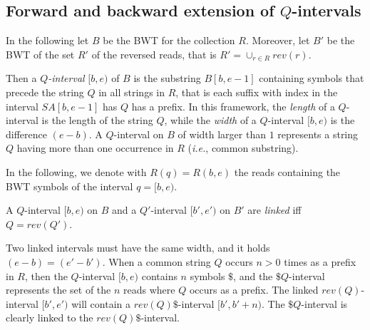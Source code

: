 \documentclass[runningheads,envcountsame,a4paper]{llncs}
\newcommand{\ie}{\textit{i.e.},\xspace}
\begin{document}



\subsection{Forward and backward extension of $Q$-intervals}

In the following let $B$ be the BWT for the collection $R$.
Moreover, let $B'$ be the BWT of the set $R'$ of the reversed reads,
that is $R' = \cup_{r \in R}rev(r)$.


Then a \emph{$Q$-interval} $[b,e)$ of $B$ is the substring $B[b, e -1]$
containing symbols that precede the string $Q$ in all strings in $R$,
that is each suffix with index in the interval $SA[b, e-1]$ has $Q$ has
a prefix.
In this framework, the \emph{length} of a $Q$-interval is the length of
the string $Q$, while the \emph{width} of a $Q$-interval $[b, e)$ is the
difference $(e-b)$.
A $Q$-interval on $B$ of width larger than $1$ represents a string $Q$
having more than one occurrence in $R$ (\ie common substring).

In the following, we denote with $R(q)=R(b,e)$ the reads containing the
BWT symbols of the interval $q=[b,e)$.


\begin{definition}
A $Q$-interval $[b,e)$ on $B$ and a $Q'$-interval $[b',e')$ on $B'$ are
\emph{linked} iff $Q=rev(Q')$.
\end{definition}

Two linked intervals must have the same width, and it holds
$(e-b)=(e'-b')$.
When a common string $Q$ occurs $n>0$ times as a prefix in $R$, then the
$Q$-interval $[b,e)$ contains $n$ symbols $\$$, and the $\$ Q$-interval
represents the set of the $n$ reads where $Q$ occurs as a prefix.
The linked $rev(Q)$-interval $[b',e')$ will contain a
$rev(Q)\$$-interval $[b',b'+n)$.
The $\$ Q$-interval is clearly linked to the $rev(Q)\$$-interval.
\end{document}
